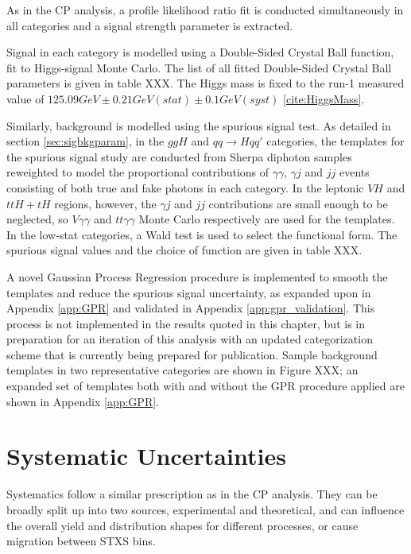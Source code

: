 As in the CP analysis, a profile likelihood ratio fit is conducted simultaneously in all categories and a signal strength parameter is extracted.

Signal in each category is modelled using a Double-Sided Crystal Ball function, fit to Higgs-signal Monte Carlo. The list of all fitted Double-Sided Crystal Ball parameters is given in table XXX. The Higgs mass is fixed to the run-1 measured value of $125.09 GeV \pm 0.21 GeV(stat) \pm 0.1 GeV(syst)$ \ref{cite:HiggsMass}.

Similarly, background is modelled using the spurious signal test. As detailed in section \ref{sec:sigbkgparam}, in the $ggH$ and $qq
 \rightarrow Hqq'$ categories, the templates for the spurious signal study are conducted from Sherpa diphoton samples reweighted to model the proportional contributions of $\gamma \gamma$, $\gamma j$ and $jj$ events consisting of both true and fake photons in each category. In the leptonic $VH$ and $ttH+tH$ regions, however, the $\gamma j$ and $jj$ contributions are small enough to be neglected, so $V\gamma\gamma$ and $tt\gamma\gamma$ Monte Carlo respectively are used for the templates. In the low-stat categories, a Wald test is used to select the functional form. The spurious signal values and the choice of function are given in table XXX.

A novel Gaussian Process Regression procedure is implemented to smooth the templates and reduce the spurious signal uncertainty, as expanded upon in Appendix \ref{app:GPR} and validated in Appendix \ref{app:gpr_validation}. This process is not implemented in the results quoted in this chapter, but is in preparation for an iteration of this analysis with an updated categorization scheme that is currently being prepared for publication. Sample background templates in two representative categories are shown in Figure XXX; an expanded set of templates both with and without the GPR procedure applied are shown in Appendix \ref{app:GPR}.

\section{Systematic Uncertainties} \label{sec:Systematics} 

Systematics follow a similar prescription as in the CP analysis. They can be broadly split up into two sources, experimental and theoretical, and can influence the overall yield and distribution shapes for different processes, or cause migration between STXS bins. 

